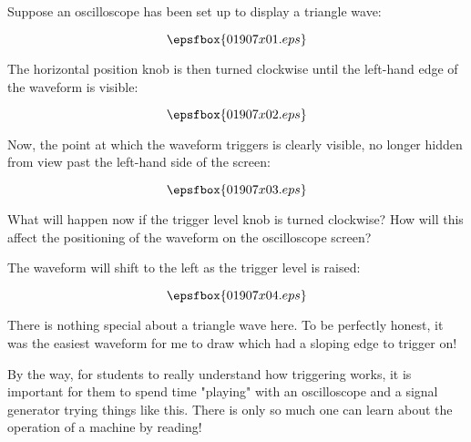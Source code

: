 

Suppose an oscilloscope has been set up to display a triangle wave:

$$\epsfbox{01907x01.eps}$$

The horizontal position knob is then turned clockwise until the left-hand edge of the waveform is visible:

$$\epsfbox{01907x02.eps}$$

Now, the point at which the waveform triggers is clearly visible, no longer hidden from view past the left-hand side of the screen:

$$\epsfbox{01907x03.eps}$$

What will happen now if the trigger level knob is turned clockwise?  How will this affect the positioning of the waveform on the oscilloscope screen?







The waveform will shift to the left as the trigger level is raised:

$$\epsfbox{01907x04.eps}$$







There is nothing special about a triangle wave here.  To be perfectly honest, it was the easiest waveform for me to draw which had a sloping edge to trigger on!

By the way, for students to really understand how triggering works, it is important for them to spend time "playing" with an oscilloscope and a signal generator trying things like this.  There is only so much one can learn about the operation of a machine by reading!




